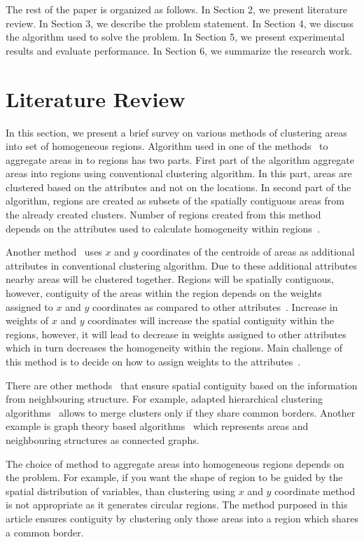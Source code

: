 \documentclass[conference]{IEEEtran}
\begin{document}
The rest of the paper is organized as follows. In Section 2, we present literature review. In Section 3, we describe the problem statement. In Section 4, we discuss the algorithm used to solve the problem. In Section 5, we present experimental results and evaluate performance. In Section 6, we summarize the research work.

\section{Literature Review}
In this section, we present a brief survey on various methods of clustering areas into set of homogeneous regions. Algorithm used in one of the methods~\cite{r4, r5} to aggregate areas in to regions has two parts. First part of the algorithm aggregate areas into regions using conventional clustering algorithm. In this part, areas are clustered based on the attributes and not on the locations. In second part of the algorithm, regions are created as subsets of the spatially contiguous areas from the already created clusters. Number of regions created from this method depends on the attributes used to calculate homogeneity within regions~\cite{r7}.

Another method~\cite{r6, r8} uses $x$ and $y$ coordinates of the centroids of areas as additional attributes in conventional clustering algorithm. Due to these additional attributes nearby areas will be clustered together. Regions will be spatially contiguous, however, contiguity of the areas within the region depends on the weights assigned to $x$ and $y$ coordinates as compared to other attributes~\cite{r24}. Increase in weights of $x$ and $y$ coordinates will increase the spatial contiguity within the regions, however, it will lead to decrease in weights assigned to other attributes which in turn decreases the homogeneity within the regions. Main challenge of this method is to decide on how to assign weights to the attributes~\cite{r6, r16, r20}.

There are other methods~\cite{r7, r8, r14, r15, r18} that ensure spatial contiguity based on the information from neighbouring structure. For example, adapted hierarchical clustering algorithms~\cite{r11, r13, r22} allows to merge clusters only if they share common borders. Another example is graph theory based algorithms~\cite{r12, r17, r24} which represents areas and neighbouring structures as connected graphs.

The choice of method to aggregate areas into homogeneous regions depends on the problem. For example, if you want the shape of region to be guided by the spatial distribution of variables, than clustering using $x$ and $y$ coordinate method is not appropriate as it generates circular regions. The method purposed in this article ensures contiguity by clustering only those areas into a region which shares a common border.
\end{document}
